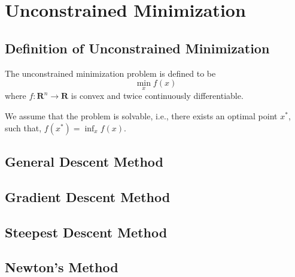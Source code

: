\chapter{Unconstrained Minimization}

\section{Definition of Unconstrained Minimization}

\begin{definition}
    The unconstrained minimization problem is defined to be
    \begin{equation}
        \min_x f(x)
    \end{equation}
    where $f:\mathbf{R}^n\rightarrow\mathbf{R}$ is convex and twice continuously differentiable.
\end{definition}

\begin{note}
    We assume that the problem is solvable, i.e., there exists an optimal point $x^*$, such that, $f(x^*)=\inf_x f(x)$.
\end{note}

\begin{example}

\end{example}

\begin{example}

\end{example}

\begin{example}

\end{example}

\begin{example}

\end{example}

\section{General Descent Method}

\section{Gradient Descent Method}

\section{Steepest Descent Method}

\section{Newton's Method}